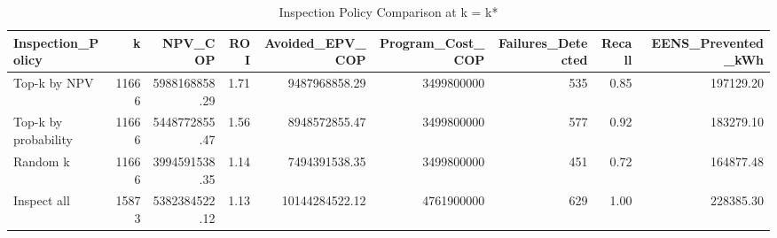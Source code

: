 \begin{table}
\caption{Inspection Policy Comparison at k = k*}
\label{tab:policy_comparison}
\begin{tabular}{lrrrrrrrr}
\toprule
Inspection_Policy & k & NPV_COP & ROI & Avoided_EPV_COP & Program_Cost_COP & Failures_Detected & Recall & EENS_Prevented_kWh \\
\midrule
Top-k by NPV & 11666 & 5988168858.29 & 1.71 & 9487968858.29 & 3499800000 & 535 & 0.85 & 197129.20 \\
Top-k by probability & 11666 & 5448772855.47 & 1.56 & 8948572855.47 & 3499800000 & 577 & 0.92 & 183279.10 \\
Random k & 11666 & 3994591538.35 & 1.14 & 7494391538.35 & 3499800000 & 451 & 0.72 & 164877.48 \\
Inspect all & 15873 & 5382384522.12 & 1.13 & 10144284522.12 & 4761900000 & 629 & 1.00 & 228385.30 \\
\bottomrule
\end{tabular}
\end{table}

